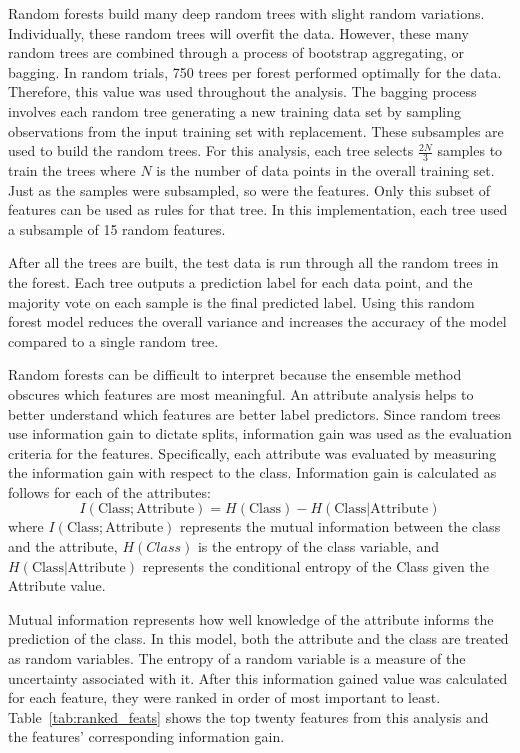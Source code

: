 \documentclass{article}
\begin{document}
Random forests build many deep random trees with slight random variations.  Individually, these random trees will overfit the data.  However, these many random trees are combined through a process of bootstrap aggregating, or bagging.  In random trials, 750 trees per forest performed optimally for the data.  Therefore, this value was used throughout the analysis.  The bagging process involves each random tree generating a new training data set by sampling observations from the input training set with replacement.  These subsamples are used to build the random trees.  For this analysis, each tree selects $\frac{2N}{3}$ samples to train the trees where $N$ is the number of data points in the overall training set.  Just as the samples were subsampled, so were the features.  Only this subset of features can be used as rules for that tree.  In this implementation, each tree used a subsample of 15 random features.

After all the trees are built, the test data is run through all the random trees in the forest.  Each tree outputs a prediction label for each data point, and the majority vote on each sample is the final predicted label.  Using this random forest model reduces the overall variance and increases the accuracy of the model compared to a single random tree.

Random forests can be difficult to interpret because the ensemble method obscures which features are most meaningful.  An attribute analysis helps to better understand which features are better label predictors.  Since random trees use information gain to dictate splits, information gain was used as the evaluation criteria for the features.  Specifically, each attribute was evaluated by measuring the information gain with respect to the class.  Information gain is calculated as follows for each of the attributes:
\begin{equation}
I(\text{Class}; \text{Attribute}) = H(\text{Class}) - H(\text{Class} | \text{Attribute})
\end{equation} \label{eq:info_gained}
where $I(\text{Class}; \text{Attribute})$ represents the mutual information between the class and the attribute, $H(Class)$ is the entropy of the class variable, and  $H(\text{Class} | \text{Attribute})$ represents the conditional entropy of the Class given the Attribute value.  

Mutual information represents how well knowledge of the attribute informs the prediction of the class.  In this model, both the attribute and the class are treated as random variables.  The entropy of a random variable is a measure of the uncertainty associated with it. After this information gained value was calculated for each feature, they were ranked in order of most important to least.  Table~\ref{tab:ranked_feats} shows the top twenty features from this analysis and the features' corresponding information gain.
\end{document}
